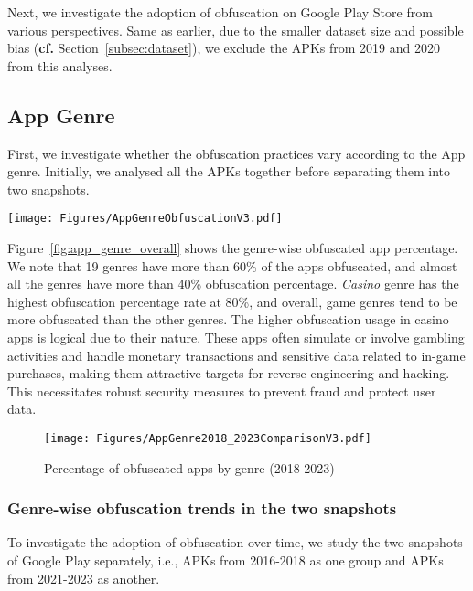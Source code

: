 Next, we investigate the adoption of obfuscation on Google Play Store from various perspectives. Same as earlier, due to the smaller dataset size and possible bias ({\bf cf.} Section~\ref{subsec:dataset}), we exclude the APKs from 2019 and 2020 from this analyses.


\subsection{App Genre}
\label{sec:app_genre}

First, we investigate whether the obfuscation practices vary according to the App genre. Initially, we analysed all the APKs together before separating them into two snapshots.


\begin{figure*}[h]
    \centering
    \texttt{[image: Figures/AppGenreObfuscationV3.pdf]}
    \caption{Obfuscated app percentage by genre (overall)}
    \label{fig:app_genre_overall}
\end{figure*}

Figure~\ref{fig:app_genre_overall} shows the genre-wise obfuscated app percentage. We note that 19 genres have more than 60\% of the apps obfuscated, and almost all the genres have more than 40\% obfuscation percentage. \textit{Casino} genre has the highest obfuscation percentage rate at 80\%, and overall, game genres tend to be more obfuscated than the other genres. The higher obfuscation usage in casino apps is logical due to their nature. These apps often simulate or involve gambling activities and handle monetary transactions and sensitive data related to in-game purchases, making them attractive targets for reverse engineering and hacking. This necessitates robust security measures to prevent fraud and protect user data. 


\begin{figure}[h]
    \centering
    \texttt{[image: Figures/AppGenre2018\_2023ComparisonV3.pdf]}
    \caption{Percentage of obfuscated apps by genre (2018-2023)}
    \label{fig:app_genre_comparison}
\end{figure}



\subsubsection{Genre-wise obfuscation trends in the two snapshots} To investigate the adoption of obfuscation over time, we study the two snapshots of Google Play separately, i.e., APKs from 2016-2018 as one group and APKs from 2021-2023 as another. 

